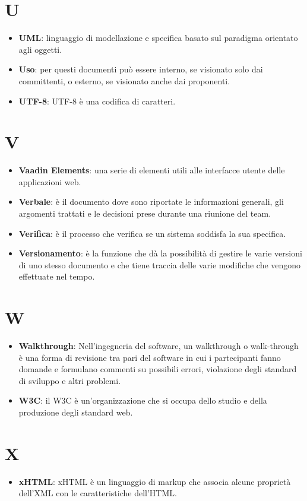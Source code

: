 \documentclass[a4paper, oneside, openany, dvipsnames, table]{article}
\begin{document}
\section{U}
\begin{itemize}
\item \textbf{UML}: linguaggio di modellazione e specifica basato sul paradigma orientato agli oggetti.
\item \textbf{Uso}: per questi documenti può essere interno, se visionato solo dai committenti, o esterno, se visionato anche dai proponenti.
\item \textbf{UTF-8}: UTF-8 è una codifica di caratteri.
\end{itemize}

\section{V}
\begin{itemize}
\item \textbf{Vaadin Elements}: una serie di elementi utili alle interfacce utente delle applicazioni web.
\item \textbf{Verbale}: è il documento dove sono riportate le informazioni generali, gli argomenti trattati e le decisioni prese durante una riunione del team.
\item \textbf{Verifica}: è il processo che verifica se un sistema soddisfa la sua specifica.
\item \textbf{Versionamento}: è la funzione che dà la possibilità di gestire le varie versioni di uno stesso documento e che tiene traccia delle varie modifiche che vengono effettuate nel tempo.
\end{itemize}

\section{W}
\begin{itemize}
\item \textbf{Walkthrough}: Nell'ingegneria del software, un walkthrough o walk-through è una forma di revisione tra pari del software in cui i partecipanti fanno domande e formulano commenti su possibili errori, violazione degli standard di sviluppo e altri problemi.
\item \textbf{W3C}: il W3C è un'organizzazione che si occupa dello studio e della produzione degli standard web.
\end{itemize}

\section{X}
\begin{itemize}
	\item \textbf{xHTML}: xHTML è un linguaggio di markup che associa alcune proprietà dell'XML con le caratteristiche dell'HTML.
\end{itemize}
\end{document}
